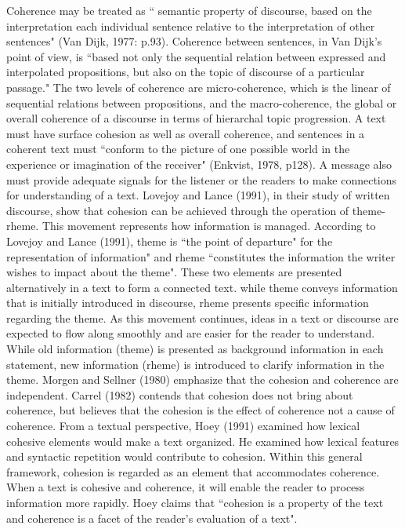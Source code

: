 Coherence may be treated as `` semantic property of discourse, based on the interpretation each individual sentence relative to the interpretation of other sentences" (Van Dijk, 1977: p.93). 
Coherence between sentences, in Van Dijk's point of view, is ``based not only the sequential relation between expressed and interpolated propositions, but also on the topic of discourse of a particular passage."
The two levels of coherence are micro-coherence, which is the linear of sequential relations between propositions, and the macro-coherence, the global or overall coherence of a discourse in terms of hierarchal topic progression. 
A text must have surface cohesion as well as overall coherence, and sentences in a coherent text must ``conform to the picture of one possible world in the experience or imagination of the receiver" (Enkvist, 1978, p128).
A message also must provide adequate signals for the listener or the readers to make connections for understanding of a text. 
Lovejoy and Lance (1991), in their study of written discourse, show that cohesion can be achieved through the operation of theme-rheme. 
This movement represents how information is managed.
According to Lovejoy and Lance (1991), theme is ``the point of departure" for the representation of information" and rheme ``constitutes the information the writer wishes to impact about the theme".
These two elements are presented alternatively in a text to form a connected text. 
while theme conveys information that is initially introduced in discourse, rheme presents specific information regarding the theme. 
As this movement continues, ideas in a text or discourse are expected to flow along smoothly and are easier for the reader to understand. 
While old information (theme) is presented as background information in each statement, new information (rheme) is introduced to clarify information in the theme. 
Morgen and Sellner (1980) emphasize that the cohesion and coherence are independent.  
Carrel (1982) contends that cohesion does not bring about coherence, but believes that the cohesion is the effect of coherence not a cause of coherence. 
From a textual perspective, Hoey (1991) examined how lexical cohesive elements would make a text organized. 
He examined how lexical features and syntactic repetition would contribute to cohesion. 
Within this general framework, cohesion is regarded as an element that accommodates coherence. 
When a text is cohesive and coherence, it will enable the reader to process information more rapidly. 
Hoey claims that ``cohesion is a property of the text and coherence is a facet of the reader's evaluation of a text". 
